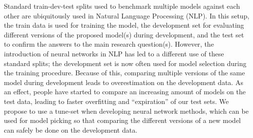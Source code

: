 Standard train-dev-test splits used to benchmark multiple models against each other are ubiquitously used in Natural Language Processing (NLP). In this setup, the train data is used for training the model, the development set for evaluating different versions of the proposed model(s) during development, and the test set to confirm the answers to the main research question(s). However, the introduction of neural networks in NLP has led to a different use of these standard splits; the development set is now often used for model selection during the training procedure. Because of this, comparing multiple versions of the same model during development leads to overestimation on the development data. As an effect, people have started to compare an increasing amount of models on the test data, leading to faster overfitting and ``expiration'' of our test sets. We propose to use a tune-set when developing neural network methods, which can be used for model picking so that comparing the different versions of a new model can safely be done on the development data.
